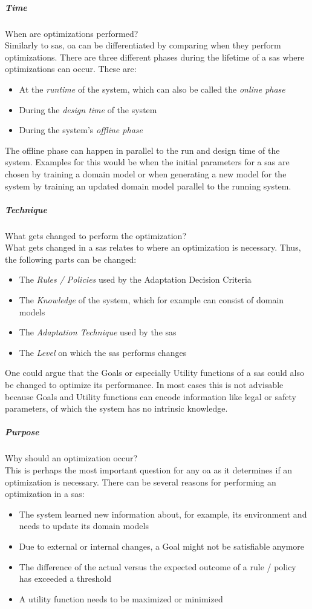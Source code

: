 \subparagraph*{Time}
When are optimizations performed? \\
Similarly to \acrshort{sas}, \acrshort{oa} can be differentiated by comparing when they perform optimizations.
There are three different phases during the lifetime of a \acrshort{sas} where optimizations can occur.
These are:
\begin{itemize}[nosep]
    \item At the \textit{runtime} of the system, which can also be called the \textit{online phase}
    \item During the \textit{design time} of the system
    \item During the system's \textit{offline phase}
\end{itemize}
The offline phase can happen in parallel to the run and design time of the system.
Examples for this would be when the initial parameters for a \acrshort{sas} are chosen by training a domain model
or when generating a new model for the system by training an updated domain model parallel to the running system.

\subparagraph*{Technique}
What gets changed to perform the optimization? \\
What gets changed in a \acrshort{sas} relates to where an optimization is necessary.
Thus, the following parts can be changed:
\begin{itemize}[nosep]
    \item The \textit{Rules / Policies} used by the Adaptation Decision Criteria
    \item The \textit{Knowledge} of the system, which for example can consist of domain models
    \item The \textit{Adaptation Technique} used by the \acrshort{sas}
    \item The \textit{Level} on which the \acrshort{sas} performs changes
\end{itemize}
One could argue that the Goals or especially Utility functions of a \acrshort{sas} could also be changed to optimize its performance.
In most cases this is not advisable because Goals and Utility functions can encode information
like legal or safety parameters, of which the system has no intrinsic knowledge.

\subparagraph*{Purpose}
Why should an optimization occur? \\
This is perhaps the most important question for any \acrshort{oa} as it determines if an optimization is necessary.
There can be several reasons for performing an optimization in a \acrshort{sas}:
\begin{itemize}[nosep]
    \item The system learned new information about, for example, its environment and needs to update its domain models
    \item Due to external or internal changes, a Goal might not be satisfiable anymore
    \item The difference of the actual versus the expected outcome of a rule / policy has exceeded a threshold
    \item A utility function needs to be maximized or minimized
\end{itemize}

